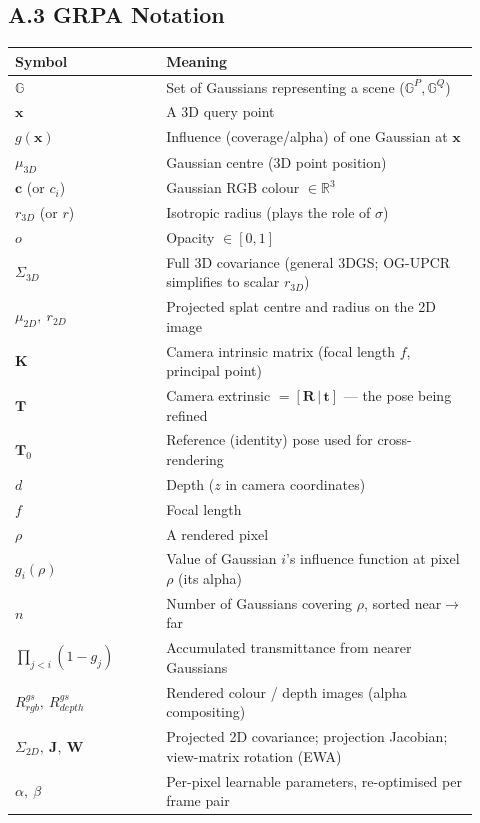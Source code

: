 \documentclass[11pt,a4paper]{article}
\begin{document}
\subsection*{A.3 GRPA Notation}
\begin{center}
\begin{tabular}{@{}p{0.3\linewidth}p{0.62\linewidth}@{}}
\toprule
Symbol & Meaning \\
\midrule
$\mathbb{G}$ & Set of Gaussians representing a scene ($\mathbb{G}^P,\mathbb{G}^Q$) \\
$\mathbf{x}$ & A 3D query point \\
$g(\mathbf{x})$ & Influence (coverage/alpha) of one Gaussian at $\mathbf{x}$ \\
$\mu_{3D}$ & Gaussian centre (3D point position) \\
$\mathbf{c}$ (or $c_i$) & Gaussian RGB colour $\in\mathbb{R}^3$ \\
$r_{3D}$ (or $r$) & Isotropic radius (plays the role of $\sigma$) \\
$o$ & Opacity $\in[0,1]$ \\
$\Sigma_{3D}$ & Full 3D covariance (general 3DGS; OG-UPCR simplifies to scalar $r_{3D}$) \\
\midrule
$\mu_{2D},\ r_{2D}$ & Projected splat centre and radius on the 2D image \\
$\mathbf{K}$ & Camera intrinsic matrix (focal length $f$, principal point) \\
$\mathbf{T}$ & Camera extrinsic $=[\mathbf{R}\,|\,\mathbf{t}]$ — the pose being refined \\
$\mathbf{T}_0$ & Reference (identity) pose used for cross-rendering \\
$d$ & Depth ($z$ in camera coordinates) \\
$f$ & Focal length \\
$\rho$ & A rendered pixel \\
$g_i(\rho)$ & Value of Gaussian $i$'s influence function at pixel $\rho$ (its alpha) \\
$n$ & Number of Gaussians covering $\rho$, sorted near$\to$far \\
$\prod_{j<i}(1-g_j)$ & Accumulated transmittance from nearer Gaussians \\
$R^{gs}_{rgb},\ R^{gs}_{depth}$ & Rendered colour / depth images (alpha compositing) \\
$\Sigma_{2D},\ \mathbf{J},\ \mathbf{W}$ & Projected 2D covariance; projection Jacobian; view-matrix rotation (EWA) \\
\midrule
$\alpha,\ \beta$ & Per-pixel learnable parameters, re-optimised per frame pair \\

\end{tabular}
\end{center}
\end{document}
